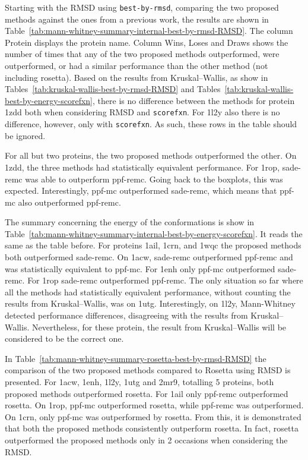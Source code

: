 

Starting with the RMSD using \texttt{best-by-rmsd}, comparing the two proposed
methods against the ones from a previous work, the results are shown in
Table~\ref{tab:mann-whitney-summary-internal-best-by-rmsd-RMSD}. The column
Protein displays the protein name. Column Wins, Loses and Draws shows the number
of times that any of the two proposed methods outperformed, were outperformed,
or had a similar performance than the other method (not including rosetta).
Based on the results from Kruskal–Wallis, as show in
Tables~\ref{tab:kruskal-wallis-best-by-rmsd-RMSD} and
Tables~\ref{tab:kruskal-wallis-best-by-energy-scorefxn}, there is no
difference between the methods for protein 1zdd both when considering RMSD and
\texttt{scorefxn}. For 1l2y also there is no difference, however, only with
\texttt{scorefxn}. As such, these rows in the table should be ignored.

For all but two proteins, the two proposed methods outperformed the other.
On 1zdd, the three methods had statistically equivalent performance. For
1rop, sade-remc was able to outperform ppf-remc. Going back to the boxplots,
this was expected. Interestingly, ppf-mc outperformed sade-remc, which means
that ppf-mc also outperformed ppf-remc.

The summary concerning the energy of the conformations is show in
Table~\ref{tab:mann-whitney-summary-internal-best-by-energy-scorefxn}. It
reads the same as the table before.
For proteins 1ail, 1crn, and 1wqc the proposed methods both outperformed
sade-remc. On 1acw, sade-remc outperformed ppf-remc and was statistically
equivalent to ppf-mc. For 1enh only ppf-mc outperformed sade-remc. For 1rop
sade-remc outperformed ppf-remc. The only situation so far where all the
methods had statistically equivalent performance, without counting the results
from Kruskal–Wallis, was on 1utg.
Interestingly, on 1l2y, Mann-Whitney detected performance differences, disagreeing with
the results from Kruskal–Wallis. Nevertheless, for these protein, the result
from Kruskal–Wallis will be considered to be the correct one.



In Table~\ref{tab:mann-whitney-summary-rosetta-best-by-rmsd-RMSD} the
comparison of the two proposed methods compared to Rosetta using RMSD is
presented. For 1acw, 1enh, 1l2y, 1utg and 2mr9, totalling 5 proteins, both
proposed methods outperformed rosetta. For 1ail only ppf-remc
outperformed rosetta. On 1rop, ppf-mc outperformed rosetta, while
ppf-remc was outperformed. On 1crn, only ppf-mc was outperformed
by rosetta. From this, it is demonstrated that both the proposed methods
consistently outperform rosetta. In fact, rosetta outperformed the proposed
methods only in 2 occasions when considering the RMSD.

